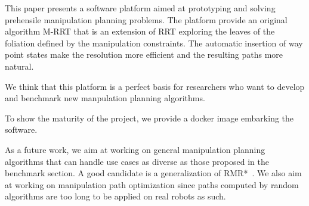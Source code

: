 This paper presents a software platform aimed at prototyping and solving
prehensile manipulation planning problems. The platform provide an original
algorithm M-RRT that is an extension of RRT exploring the leaves of the
foliation defined by the manipulation constraints. The automatic insertion
of way point states make the resolution more efficient and the resulting paths
more natural.

We think that this platform is a perfect basis for researchers who want to
develop and benchmark new manpulation planning algorithms.

To show the maturity of the project, we provide a docker image embarking the
software.

As a future work, we aim at working on general manipulation planning algorithms
that can handle use cases as diverse as those proposed in the benchmark section.
A good candidate is a generalization of RMR*~\cite{schmitt17icra}. We also aim at working on manipulation path optimization since paths computed by
random algorithms are too long to be applied on real robots as such.
